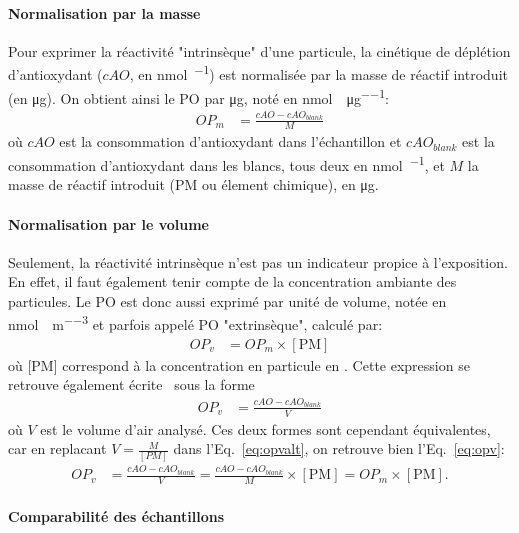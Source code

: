 \paragraph{Normalisation par la masse}%
\label{par:normalisation_par_la_masse}
Pour exprimer la réactivité "intrinsèque" d'une particule, la cinétique de déplétion
d'antioxydant ($cAO$, en \si{\nmol\per\min}) est normalisée par la masse de réactif
introduit (en \si{\ug}). On obtient ainsi le PO par \si{\ug}, noté \OPm{} en
\si{\nmol\per\min\per\micro\g}:
\begin{align}
    \label{eq:opm}
    OP_m &= \frac{cAO - cAO_{blank}}{M}
\end{align}
où $cAO$ est la consommation d'antioxydant dans l'échantillon et $cAO_{blank}$
est la consommation d'antioxydant dans les blancs, tous deux en \si{\nmol\per\min}, et $M$
la masse de réactif introduit (PM ou élement chimique), en \si{\ug}.

\paragraph{Normalisation par le volume}%
\label{par:normalisation_par_le_volume}

Seulement, la réactivité intrinsèque n'est pas un indicateur propice à l'exposition. En
effet, il faut également tenir compte de la concentration ambiante des particules. Le PO
est donc aussi exprimé par unité de volume, notée \OPv{} en
\si{\nmol\per\min\per\cubic\meter} et parfois appelé PO "extrinsèque", calculé par:
\begin{align}
    \label{eq:opv}
    OP_v &= OP_m \times [\text{PM}]
\end{align}
où [PM] correspond à la concentration en particule en \si{\ugm}. Cette expression se
retrouve également écrite~\autocite{fangSemiautomated2015} sous la forme
\begin{align}
    \label{eq:opvalt}
    OP_v &= \frac{cAO - cAO_{blank}}{V}
\end{align}
où $V$ est le volume d'air analysé. Ces deux formes sont cependant équivalentes, car en
replacant $V = \frac{M}{[PM]}$ dans l'Eq.~\ref{eq:opvalt}, on retrouve bien
l'Eq.~\ref{eq:opv}:
\begin{align}
    \label{eq:opvopvalt}
    OP_v &= \frac{cAO -cAO_{blank}}{V} = \frac{cAO -cAO_{blank}}{M}\times [\text{PM}] = OP_m \times [\text{PM}].
\end{align}

\paragraph{Comparabilité des échantillons}%
\label{par:comparabilité_des_échantillons}


